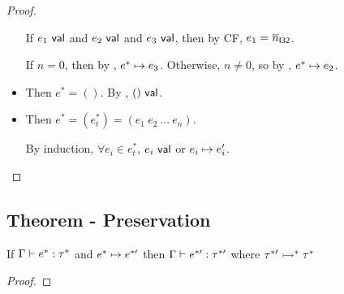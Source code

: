 \documentclass{article}
\begin{document}
\begin{proof}
\begin{itemize}
            If $e_1 ~\mathsf{val}$ and $e_2 ~\mathsf{val}$ and $e_3 ~\mathsf{val}$, then by CF, $e_1 = \overline{n}_{\mathsf{I32}}$.
            
            If $n = 0$, then by , $e^* \mapsto e_3$.
            Otherwise, $n \neq 0$, so by , $e^* \mapsto e_2$.
        
        \item {}
            Then $e^* = ()$. By , $() ~\mathsf{val}$.
        
        \item {}
            Then $e^* = (e^*_t) = (e_1~ e_2~ ...~ e_n)$.
            
            By induction, $\forall e_i \in e^*_t$, $e_i ~\mathsf{val}$ or $e_i \mapsto e_i'$.
            
    \end{itemize}
\end{proof}

\subsection{Theorem - Preservation}
If $\Gamma \vdash e^* : \tau^*$ and $e^* \mapsto e^{*\prime}$ then $\Gamma \vdash e^{*\prime} : \tau^{*\prime}$ where $\tau^{*\prime} \rightarrowtail^* \tau^*$
\begin{proof}
    
\end{proof}
\end{document}
